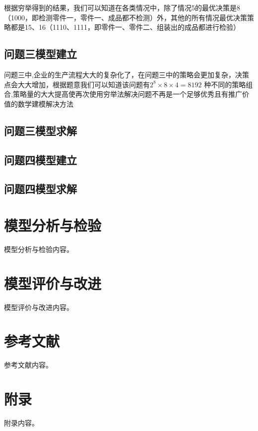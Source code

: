 \documentclass[withoutpreface,bwprint]{cumcmthesis}
\begin{document}
根据穷举得到的结果，我们可以知道在各类情况中，除了情况5的最优决策是8（1000，即检测零件一，零件一、成品都不检测）外，其他的所有情况最优决策策略都是15、16（1110、1111，即零件一、零件二、组装出的成品都进行检验）

\subsection{问题三模型建立}
问题三中,企业的生产流程大大的复杂化了，在问题三中的策略会更加复杂，决策点会大大增加，根据题意我们可以知道该问题有$ 2^{8} \times 8 \times 4 = 8192 $ 种不同的策略组合,策略量的大大提高使再次使用穷举法解决问题不再是一个足够优秀且有推广价值的数学建模解决方法


\subsection{问题三模型求解}

\subsection{问题四模型建立}

\subsection{问题四模型求解}


\section{模型分析与检验}
模型分析与检验内容。

\section{模型评价与改进}
模型评价与改进内容。

\section{参考文献}
参考文献内容。

\section{附录}
附录内容。
\end{document}
